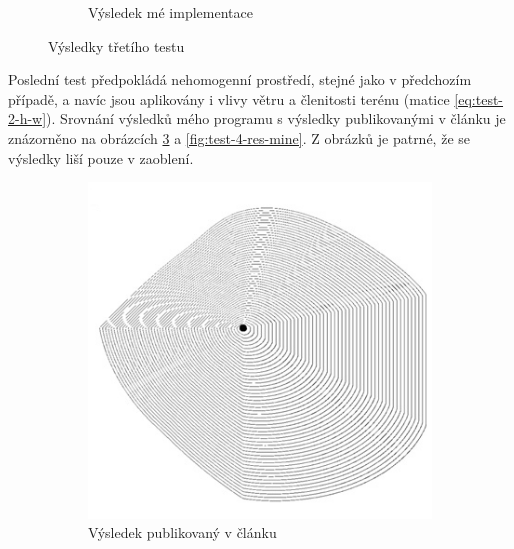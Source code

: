 \documentclass[11pt,a4paper]{scrartcl}
\begin{document}
\begin{figure}[H]
\begin{subfigure} {0.3 \textwidth}
			\caption{Výsledek mé implementace}
			\label{fig:test-3-res-mine}
		\end{subfigure}
		
		\caption{Výsledky třetího testu}
		\label{fig:test-3-res}
	\end{figure}

	Poslední test předpokládá nehomogenní prostředí, stejné jako v předchozím případě, a navíc jsou aplikovány i vlivy větru a členitosti terénu (matice \ref{eq:test-2-h-w}). Srovnání výsledků mého programu s výsledky publikovanými v článku je znázorněno na obrázcích \ref{fig:test-4-res-art} a \ref{fig:test-4-res-mine}. Z obrázků je patrné, že se výsledky liší pouze v zaoblení.
	
	\begin{figure}[H]
		\centering
		\begin{subfigure} {0.3 \textwidth}
			\includegraphics[width=\linewidth]{art-inhomogeneous-wh}
			\caption{Výsledek publikovaný v článku}
			\label{fig:test-4-res-art}
		\end{subfigure}
		\hspace*{0.1 \textwidth}
		\begin{subfigure} {0.3 \textwidth}

\end{subfigure}
\end{figure}
\end{document}
